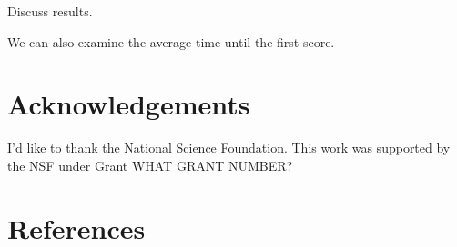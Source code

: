 \documentclass[article]{jss}
\begin{document}
Discuss results.

We can also examine the average time until the first score.

\section*{Acknowledgements}
I'd like to thank the National Science Foundation. This work was supported by the NSF under Grant WHAT GRANT NUMBER? 

\section*{References}
\end{document}
